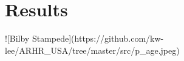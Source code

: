 \section{Results}\label{sec:results}

![Bilby Stampede](https://github.com/kw-lee/ARHR_USA/tree/master/src/p_age.jpeg)
